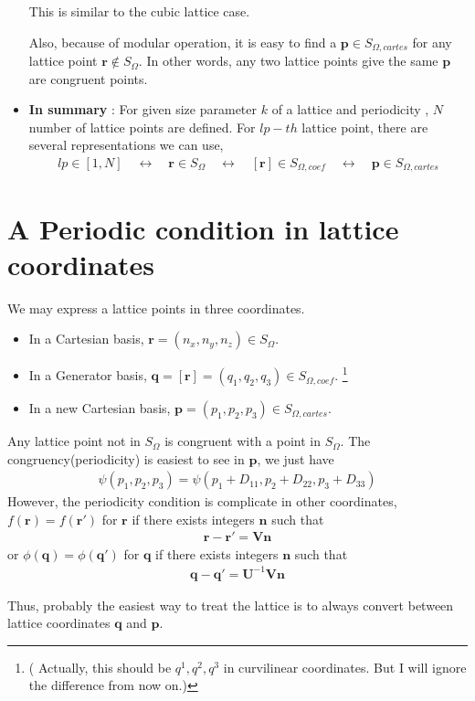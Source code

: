 \documentclass[10pt]{book}
\def\bm{\boldsymbol}
\newcommand{\bea}{\begin{eqnarray}}
\newcommand{\eea}{\end{eqnarray}}
\def\vn{{\bm n}}
\def\vp{{\bm p}}
\def\vq{{\bm q}}
\def\vr{{\bm r}}
\begin{document}
\begin{itemize}
   This is similar to the cubic lattice case. 
   
   Also, because of modular operation, it is easy to find 
   a ${\bm p}\in S_{\Omega,cartes}$ for any lattice point $\vr\notin S_\Omega$. 
   In other words, any two lattice points give the same  ${\bm p}$ are congruent points. 
   
\item {\bf In summary} : For given size parameter $k$ of a lattice and periodicity , 
      $N$ number of lattice points are defined. For $lp-th$ lattice point, 
      there are several representations we can use,
      \bea 
      lp \in [1,N] \quad \leftrightarrow \quad {\bm r} \in S_\Omega 
      \quad \leftrightarrow \quad [{\bm r}] \in S_{\Omega,coef} 
      \quad \leftrightarrow \quad {\bm p} \in S_{\Omega,cartes}
      \eea 
            
\end{itemize}


\section{A Periodic condition in lattice coordinates } 
We may express a lattice points in three coordinates. 
\begin{itemize}
	\item In a Cartesian basis, ${\bm r}=(n_x,n_y,n_z)\in S_{\Omega}$. 
	\item In a Generator basis, ${\bm q}=[{\bm r}]=(q_1,q_2,q_3)\in S_{\Omega,coef}$. 
	\footnote{ ({\color{red} Actually, this should be $q^1,q^2,q^3$ in curvilinear coordinates. 
		But I will ignore the difference from now on.}) }
	\item In a new Cartesian basis, ${\bm p}=(p_1,p_2,p_3)\in S_{\Omega,cartes}$.
\end{itemize}

Any lattice point not in $S_\Omega$ is congruent with a point in $S_\Omega$.
The congruency(periodicity) is easiest to see in ${\bm p}$, we just have 
\bea 
\psi(p_1,p_2,p_3)=\psi(p_1+ D_{11},p_2+ D_{22},p_3+ D_{33})
\eea 
However, the periodicity condition is complicate in other coordinates, 
$f(\vr)=f(\vr')$ for ${\bm r}$ if there exists integers $\vn$ such that 
\bea 
\vr-\vr'={\bm V}{\vn} 
\eea 
or $\phi(\vq)=\phi(\vq')$ for ${\bm q}$ if there exists integers $\vn$ such that
\bea 
\vq-\vq'={\bm U}^{-1}{\bm V}\vn 
\eea 

Thus, probably the easiest way to treat the lattice is to 
always convert between lattice coordinates $\vq$ and $\vp$. 
\end{document}

